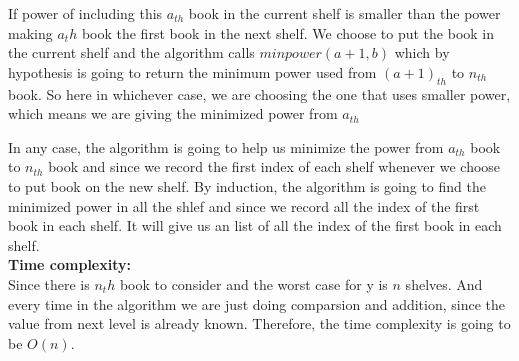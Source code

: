 \documentclass[14pt]{article}
\begin{document}
\begin{enumerate}
\begin{itemize}
        If power of 
        including this $a_{th}$ book in the current shelf is smaller than the power
        making $a_th$ book the first book in the next shelf. We choose to put the 
        book in the current shelf and the algorithm calls $minpower(a+1, b)$ which 
        by hypothesis is going to return the minimum power used from $(a+1)_{th}$ to 
        $n_{th}$ book. So here in whichever case, we are choosing the one that uses
        smaller power, which means we are giving the minimized power from $a_{th}$
    \end{itemize}
    In any case, the algorithm is going to help us minimize the power from $a_{th}$
    book to $n_{th}$ book and since we record the first index of each shelf whenever
    we choose to put book on the new shelf. By induction, the algorithm is going to
    find the minimized power in all the shlef and since we record all the index 
    of the first book in each shelf. It will give us an list of all the index of 
    the first book in each shelf.\\
    \textbf{Time complexity:}\\ Since there is $n_th$ book to consider and the worst 
    case for y is $n$ shelves. And every time in the algorithm we are just doing 
    comparsion and addition, since the value from next level is already known. 
    Therefore, the time complexity is going to be $O(n)$.
\end{enumerate}
\end{document}
